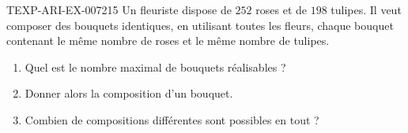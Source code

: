 \begin{exercice}{TEXP-ARI-EX-007}{2}{15}
Un fleuriste dispose de $252$ roses et de $198$ tulipes. Il veut composer des
bouquets identiques, en utilisant toutes les fleurs, chaque bouquet contenant
le même nombre de roses et le même nombre de tulipes.
\begin{enumerate}
  \item Quel est le nombre maximal de bouquets réalisables ?
  \item Donner alors la composition d'un bouquet.
  \item Combien de compositions différentes sont possibles en tout ?
\end{enumerate}
\end{exercice}
